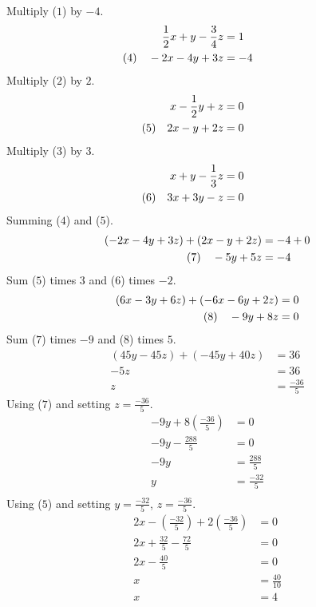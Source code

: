 Multiply ($1$) by $-4$.
\begin{align*}
    \frac{1}{2}x + y - \frac{3}{4}z &= 1 \\
    \hspace{-2cm}\text{(4)}\quad -2x - 4y + 3z &= -4 
\end{align*}
Multiply ($2$) by $2$.
\begin{align*}
    x - \frac{1}{2}y + z &= 0 \\
    \hspace{-2cm}\text{(5)}\quad 2x - y + 2z &= 0
\end{align*}
Multiply ($3$) by $3$.
\begin{align*}
    x + y - \frac{1}{3}z &= 0 \\
    \hspace{-2cm}\text{(6)}\quad 3x + 3y - z &= 0
\end{align*}
Summing ($4$) and ($5$).
\begin{align*}
    (-2x - 4y + 3z) + (2x - y + 2z) &= -4 + 0 \\
    \hspace{-2cm}\text{(7)}\quad -5y + 5z &= -4 
\end{align*}
Sum ($5$) times $3$ and ($6$) times $-2$.
\begin{align*}
    (6x - 3y + 6z) + (-6x - 6y + 2z) &= 0 \\
    \hspace{-2cm}\text{(8)}\quad -9y + 8z &= 0
\end{align*}
Sum ($7$) times $-9$ and ($8$) times $5$.
\begin{align*}
    (45y - 45z) + (-45y + 40z) &= 36 \\
    -5z &= 36 \\
    z &= \frac{-36}{5}
\end{align*}
Using ($7$) and setting $z = \frac{-36}{5}$.
\begin{align*}
    -9y + 8(\frac{-36}{5}) &= 0 \\
    -9y - \frac{288}{5} &= 0 \\
    -9y &= \frac{288}{5} \\
    y &= \frac{-32}{5} \\
\end{align*}
Using ($5$) and setting $y = \frac{-32}{5}$, $z = \frac{-36}{5}$.
\begin{align*}
    2x - (\frac{-32}{5}) + 2(\frac{-36}{5}) &= 0 \\
    2x + \frac{32}{5} - \frac{72}{5} &= 0 \\
    2x - \frac{40}{5}  &= 0 \\
    x &= \frac{40}{10}  \\
    x &= 4 
\end{align*}

